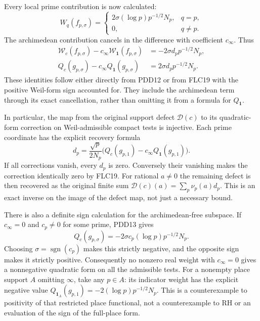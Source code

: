 \documentclass[11pt]{article}
\begin{document}
Every local prime contribution is now calculated:
\[
W_q(f_{p,\sigma})
=\begin{cases}
2\sigma(\log p)p^{-1/2}N_p,&q=p,\\
0,&q\ne p.
\end{cases}
\tag{PDD12}
\]
The archimedean contribution cancels in the difference
with coefficient $c_\infty$. Thus
\[
\begin{split}
\mathcal W_c(f_{p,\sigma})
-c_\infty\mathcal W_{\mathbf1}(f_{p,\sigma})
&=-2\sigma d_p p^{-1/2}N_p,\\
Q_c(g_{p,\sigma})-c_\infty Q_{\mathbf1}(g_{p,\sigma})
&=2\sigma d_p p^{-1/2}N_p.
\end{split}
\tag{PDD13}
\]
These identities follow either directly from PDD12 or
from FLC19 with the positive Weil-form sign accounted
for. They include the archimedean term through its
exact cancellation, rather than omitting it from a
formula for $Q_{\mathbf1}$.

In particular, the map from the original support defect
$\mathscr D(c)$ to its quadratic-form correction on
Weil-admissible compact tests is injective. Each prime
coordinate has the explicit recovery formula
\[
d_p=\frac{\sqrt p}{2N_p}
\bigl(Q_c(g_{p,1})-c_\infty Q_{\mathbf1}(g_{p,1})\bigr).
\tag{PDD14}
\]
If all corrections vanish, every $d_p$ is zero. Conversely
their vanishing makes the correction identically zero
by FLC19. For rational $a\ne0$ the remaining defect is
then recovered as the original finite sum
$\mathscr D(c)(a)=\sum_p\nu_p(a)d_p$.
This is an exact inverse on the image of the defect map,
not just a necessary bound.

There is also a definite sign calculation for the
archimedean-free subspace. If $c_\infty=0$ and
$c_p\ne0$ for some prime, PDD13 gives
\[
Q_c(g_{p,\sigma})
=-2\sigma c_p(\log p)p^{-1/2}N_p.
\tag{PDD15}
\]
Choosing $\sigma=\operatorname{sgn}(c_p)$ makes this
strictly negative, and the opposite sign makes it
strictly positive. Consequently no nonzero real weight
with $c_\infty=0$ gives a nonnegative quadratic form on
all the admissible tests. For a nonempty place support
$A$ omitting $\infty$, take any $p\in A$: its indicator
weight has the explicit negative value
$Q_{\mathbf1_A}(g_{p,1})=-2(\log p)p^{-1/2}N_p$.
This is a counterexample to positivity of that restricted
place functional, not a counterexample to RH or an
evaluation of the sign of the full-place form.
\end{document}
